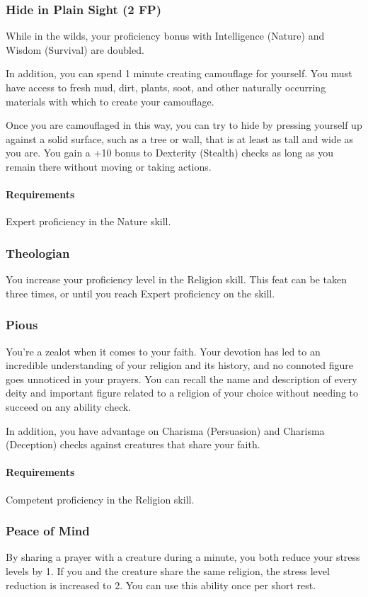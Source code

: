 \subsubsection{Hide in Plain Sight (2 FP)} \label{feat::hideinplainsight}
    While in the wilds, your proficiency bonus with Intelligence (Nature) and Wisdom (Survival) are doubled.

    In addition, you can spend 1 minute creating camouflage for yourself.
    You must have access to fresh mud, dirt, plants, soot, and other naturally occurring materials with which to create your camouflage.

    Once you are camouflaged in this way, you can try to hide by pressing yourself up against a solid surface, such as a tree or wall, that is at least as tall and wide as you are.
    You gain a +10 bonus to Dexterity (Stealth) checks as long as you remain there without moving or taking actions.
    \paragraph{Requirements} Expert proficiency in the Nature skill.
\subsubsection{Theologian} \label{feat::theologian}
    You increase your proficiency level in the Religion skill.
    This feat can be taken three times, or until you reach Expert proficiency on the skill.
\subsubsection{Pious} \label{feat::pious}
    You're a zealot when it comes to your faith.
    Your devotion has led to an incredible understanding of your religion and its history, and no connoted figure goes unnoticed in your prayers.
    You can recall the name and description of every deity and important figure related to a religion of your choice without needing to succeed on any ability check.

    In addition, you have advantage on Charisma (Persuasion) and Charisma (Deception) checks against creatures that share your faith.
    \paragraph{Requirements} Competent proficiency in the Religion skill.
\subsubsection{Peace of Mind} \label{feat::peaceofmind}
    By sharing a prayer with a creature during a minute, you both reduce your stress levels by 1.
    If you and the creature share the same religion, the stress level reduction is increased to 2.
    You can use this ability once per short rest.
